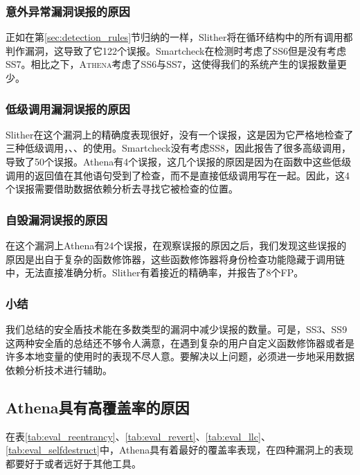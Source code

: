 \subsubsection{意外异常漏洞误报的原因}

正如在第\ref{sec:detection_rules}节归纳的一样，Slither将在循环结构中的所有调用都判作漏洞，这导致了它122个误报。Smartcheck在检测时考虑了SS6但是没有考虑SS7。相比之下，\textsc{Athena}考虑了SS6与SS7，这使得我们的系统产生的误报数量更少。

\subsubsection{低级调用漏洞误报的原因}

Slither在这个漏洞上的精确度表现很好，没有一个误报，这是因为它严格地检查了三种低级调用，、、的使用。Smartcheck没有考虑SS8，因此报告了很多高级调用，导致了50个误报。Athena有4个误报，这几个误报的原因是因为在函数中这些低级调用的返回值在其他语句受到了检查，而不是直接低级调用写在一起。因此，这4个误报需要借助数据依赖分析去寻找它被检查的位置。

\subsubsection{自毁漏洞误报的原因}

在这个漏洞上Athena有24个误报，在观察误报的原因之后，我们发现这些误报的原因是出自于复杂的函数修饰器，这些函数修饰器将身份检查功能隐藏于调用链中，无法直接准确分析。Slither有着接近的精确率，并报告了8个FP。

\subsubsection{小结}

我们总结的安全盾技术能在多数类型的漏洞中减少误报的数量。可是，SS3、SS9这两种安全盾的总结还不够令人满意，在遇到复杂的用户自定义函数修饰器或者是许多本地变量的使用时的表现不尽人意。要解决以上问题，必须进一步地采用数据依赖分析技术进行辅助。

\subsection{Athena具有高覆盖率的原因}

在表\ref{tab:eval_reentrancy}、\ref{tab:eval_revert}、\ref{tab:eval_llc}、\ref{tab:eval_selfdestruct}中，Athena具有着最好的覆盖率表现，在四种漏洞上的表现都要好于或者远好于其他工具。

